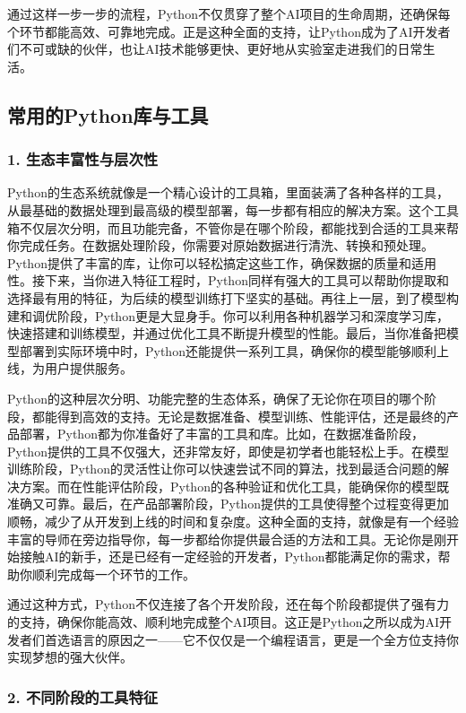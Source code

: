 通过这样一步一步的流程，Python不仅贯穿了整个AI项目的生命周期，还确保每个环节都能高效、可靠地完成。正是这种全面的支持，让Python成为了AI开发者们不可或缺的伙伴，也让AI技术能够更快、更好地从实验室走进我们的日常生活。

\subsection{常用的Python库与工具}

\subsubsection{1. 生态丰富性与层次性}


Python的生态系统就像是一个精心设计的工具箱，里面装满了各种各样的工具，从最基础的数据处理到最高级的模型部署，每一步都有相应的解决方案。这个工具箱不仅层次分明，而且功能完备，不管你是在哪个阶段，都能找到合适的工具来帮你完成任务。在数据处理阶段，你需要对原始数据进行清洗、转换和预处理。Python提供了丰富的库，让你可以轻松搞定这些工作，确保数据的质量和适用性。接下来，当你进入特征工程时，Python同样有强大的工具可以帮助你提取和选择最有用的特征，为后续的模型训练打下坚实的基础。再往上一层，到了模型构建和调优阶段，Python更是大显身手。你可以利用各种机器学习和深度学习库，快速搭建和训练模型，并通过优化工具不断提升模型的性能。最后，当你准备把模型部署到实际环境中时，Python还能提供一系列工具，确保你的模型能够顺利上线，为用户提供服务。

Python的这种层次分明、功能完整的生态体系，确保了无论你在项目的哪个阶段，都能得到高效的支持。无论是数据准备、模型训练、性能评估，还是最终的产品部署，Python都为你准备好了丰富的工具和库。比如，在数据准备阶段，Python提供的工具不仅强大，还非常友好，即使是初学者也能轻松上手。在模型训练阶段，Python的灵活性让你可以快速尝试不同的算法，找到最适合问题的解决方案。而在性能评估阶段，Python的各种验证和优化工具，能确保你的模型既准确又可靠。最后，在产品部署阶段，Python提供的工具使得整个过程变得更加顺畅，减少了从开发到上线的时间和复杂度。这种全面的支持，就像是有一个经验丰富的导师在旁边指导你，每一步都给你提供最合适的方法和工具。无论你是刚开始接触AI的新手，还是已经有一定经验的开发者，Python都能满足你的需求，帮助你顺利完成每一个环节的工作。

通过这种方式，Python不仅连接了各个开发阶段，还在每个阶段都提供了强有力的支持，确保你能高效、顺利地完成整个AI项目。这正是Python之所以成为AI开发者们首选语言的原因之一——它不仅仅是一个编程语言，更是一个全方位支持你实现梦想的强大伙伴。

\subsubsection{2. 不同阶段的工具特征}

